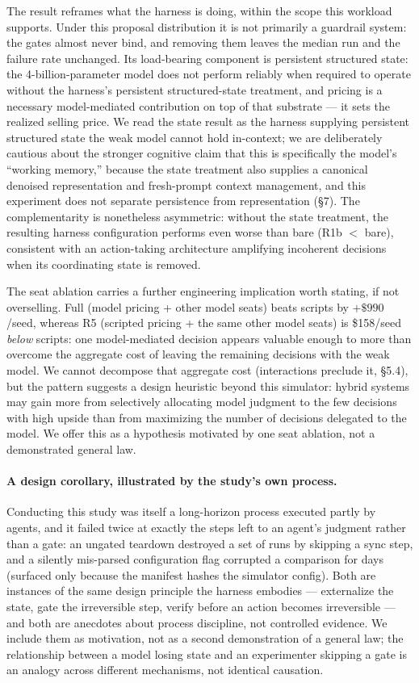 \documentclass[11pt]{article}
\begin{document}
The result reframes what the harness is doing, within the scope this workload
supports. Under this proposal distribution it is not primarily a guardrail
system: the gates almost never bind, and removing them leaves the median run and
the failure rate unchanged. Its load-bearing component is persistent structured
state: the 4-billion-parameter model does not perform reliably when required to
operate without the harness's persistent structured-state treatment, and pricing
is a necessary model-mediated contribution on top of that substrate --- it sets
the realized selling price. We read the state result as the harness supplying
persistent structured state the weak model cannot hold in-context; we are
deliberately cautious about the stronger cognitive claim that this is
specifically the model's ``working memory,'' because the state treatment also
supplies a canonical denoised representation and fresh-prompt context
management, and this experiment does not separate persistence from
representation (\S7). The complementarity is nonetheless asymmetric: without the
state treatment, the resulting harness configuration performs even worse than
bare (R1b $<$ bare), consistent with an action-taking architecture amplifying
incoherent decisions when its coordinating state is removed.

The seat ablation carries a further engineering implication worth stating, if
not overselling. Full (model pricing + other model seats) beats scripts by
$+\$990$/seed, whereas R5 (scripted pricing + the same other model seats) is
\$158/seed \emph{below} scripts: one model-mediated decision appears valuable
enough to more than overcome the aggregate cost of leaving the remaining
decisions with the weak model. We cannot decompose that aggregate cost
(interactions preclude it, \S5.4), but the pattern suggests a design heuristic
beyond this simulator: hybrid systems may gain more from selectively allocating
model judgment to the few decisions with high upside than from maximizing the
number of decisions delegated to the model. We offer this as a hypothesis
motivated by one seat ablation, not a demonstrated general law.

\paragraph{A design corollary, illustrated by the study's own process.}
Conducting this study was itself a long-horizon process executed partly by
agents, and it failed twice at exactly the steps left to an agent's judgment
rather than a gate: an ungated teardown destroyed a set of runs by skipping a
sync step, and a silently mis-parsed configuration flag corrupted a comparison
for days (surfaced only because the manifest hashes the simulator config). Both
are instances of the same design principle the harness embodies --- externalize
the state, gate the irreversible step, verify before an action becomes
irreversible --- and both are anecdotes about process discipline, not controlled
evidence. We include them as motivation, not as a second demonstration of a
general law; the relationship between a model losing state and an experimenter
skipping a gate is an analogy across different mechanisms, not identical
causation.
\end{document}
